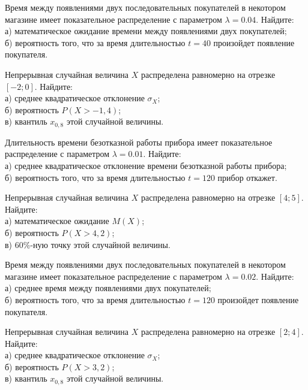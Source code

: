 \z Время между появлениями двух последовательных покупателей в некотором магазине имеет показательное распределение с параметром $\lambda = 0.04$. Найдите: \\ \quad а) математическое ожидание времени между появлениями двух покупателей; \\ \quad б) вероятность того, что за время длительностью $t = 40$  произойдет появление покупателя.
 

\vfill

\newpage\setcounter{zad}{0}

\z Непрерывная случайная величина $X$ распределена равномерно на отрезке $[-2; 0]$. Найдите: \\ \quad а) среднее квадратическое отклонение $\sigma_X$; \\ \quad б) вероятность $P(X>-1{,}4)$; \\ \quad в) квантиль $x_{0{,}8}$ этой случайной величины.


\vfill

\z Длительность времени безотказной работы прибора имеет показательное распределение с параметром $\lambda = 0.01$. Найдите: \\ \quad а) среднее квадратическое отклонение времени безотказной работы прибора; \\ \quad б) вероятность того, что за время длительностью $t = 120$ прибор  откажет.
 

\vfill

\newpage\setcounter{zad}{0}

\z Непрерывная случайная величина $X$ распределена равномерно на отрезке $[4; 5]$. Найдите: \\ \quad а) математическое ожидание $M(X)$; \\ \quad б) вероятность $P(X>4{,}2)$; \\ \quad в) $60\%$-ную точку этой случайной величины.


\vfill

\z Время между появлениями двух последовательных покупателей в некотором магазине имеет показательное распределение с параметром $\lambda = 0.02$. Найдите: \\ \quad а) среднее время между появлениями двух покупателей; \\ \quad б) вероятность того, что за время длительностью $t = 120$  произойдет появление покупателя.
 

\vfill

\newpage\setcounter{zad}{0}

\z Непрерывная случайная величина $X$ распределена равномерно на отрезке $[2; 4]$. Найдите: \\ \quad а) среднее квадратическое отклонение $\sigma_X$; \\ \quad б) вероятность $P(X>3{,}2)$; \\ \quad в) квантиль $x_{0{,}8}$ этой случайной величины.


